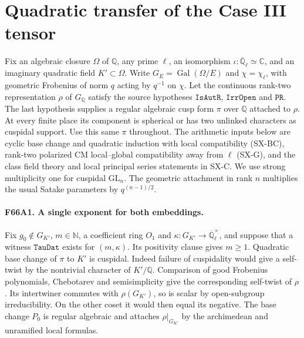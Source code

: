 \section{Quadratic transfer of the Case III tensor}
\label{sec:tensor-transfer66}

Fix an algebraic closure $\Omega$ of $\mathbb Q$, any prime $\ell$,
an isomorphism $\iota:\overline{\mathbb Q}_\ell\simeq\mathbb C$,
and an imaginary quadratic field $K'\subset\Omega$.  Write
$G_E=\operatorname{Gal}(\Omega/E)$ and
$\chi=\chi_\ell$, with geometric Frobenius of norm $q$ acting by
$q^{-1}$ on $\chi$.  Let the continuous rank-two representation $\rho$
of $G_{\mathbb Q}$ satisfy the source hypotheses
$\texttt{IsAutR}$, $\texttt{IrrOpen}$ and $\texttt{PR}$.
The last hypothesis supplies a regular algebraic cusp form $\pi$ over
$\mathbb Q$ attached to $\rho$. At every finite place its component
is spherical or has two unlinked characters as cuspidal support.
Use this same $\pi$ throughout.  The arithmetic inputs below are cyclic
base change and quadratic induction with local compatibility (SX-BC),
rank-two polarized CM local--global compatibility away from $\ell$
(SX-G), and the class field theory and local principal series
statements in SX-C.  We use strong multiplicity one for cuspidal
$\mathrm{GL}_n$.  The geometric attachment in rank $n$ multiplies
the usual Satake parameters by $q^{(n-1)/2}$.

\paragraph{F66A1. A single exponent for both embeddings.}
Fix $g_0\notin G_{K'}$, $m\in\mathbb N$, a coefficient ring
$O_1$ and $\kappa:G_{K'}\to\overline{\mathbb Q}_\ell^\times$,
and suppose that a witness $\texttt{TauDat}$ exists for $(m,\kappa)$.
Its positivity clause gives $m\ge1$.
Quadratic base change of $\pi$ to $K'$ is cuspidal. Indeed failure
of cuspidality would give a self-twist by the nontrivial character
of $K'/\mathbb Q$. Comparison of good Frobenius polynomials,
Chebotarev and semisimplicity give the corresponding self-twist of
$\rho$. Its intertwiner commutes with $\rho(G_{K'})$, so is scalar
by open-subgroup irreducibility. On the other coset it would then
equal its negative. The base change $P_0$ is regular algebraic
and attaches $\rho|_{G_{K'}}$ by the archimedean and unramified
local formulas.

